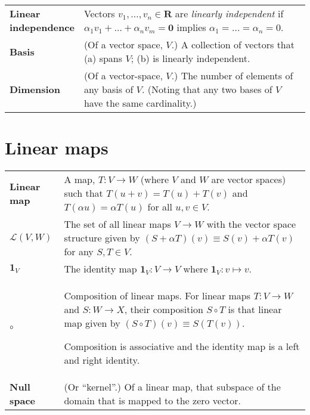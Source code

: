 \documentclass[10pt, a4paper, landscape]{article}
\newcommand{\defn}[1]{\textbf{#1}}
\newcommand{\set}[1]{\mathbold{#1}}
\begin{document}
\begin{multicols*}{3}
\begin{tabularx}{\columnwidth}{@{}l>{\raggedright\arraybackslash}X@{}}
  \parbox[t]{0.8in}{\defn{Linear\\ independence}} & Vectors $v_1, \dots, v_n \in \set{R}$ are \emph{linearly independent} if $\alpha_1 v_1 + \dots + \alpha_n v_m = \set{0}$ implies $\alpha_1 = \dots = \alpha_n=0$. \\

  \defn{Basis} & (Of a vector space, $V$.) A collection of vectors that (a) spans $V$; (b) is linearly independent. \\

  \defn{Dimension} & (Of a vector-space, $V$.) The number of elements of any basis of $V$. (Noting that any two bases of $V$ have the same cardinality.) \\
  
\end{tabularx}



\section*{Linear maps}
\begin{tabularx}{\columnwidth}{@{}l>{\raggedright\arraybackslash}X@{}}
  \toprule

  \defn{Linear map} & A map, $T\colon V\to W$ (where $V$ and $W$ are
  vector spaces) such that $T(u+v) = T(u)+T(v)$ and $T(\alpha u) = \alpha T(u)$
  for all $u,v\in V$. \\

  $\mathcal{L}(V, W)$ & The set of all linear maps $V\to W$ with the vector space structure given by $(S+\alpha T)(v) \equiv S(v)+\alpha T(v)$ for any $S,T\in V$. \\

  $\mathbf{1}_V$ & The identity map $\mathbf{1}_V\colon V\to V$ where $\mathbf{1}_V\colon v\mapsto v$. \\

  $\circ$ & Composition of linear maps. For linear maps $T\colon V\to W$ and $S\colon W\to X$, their composition $S\circ T$ is that linear map given by $(S\circ T)(v) \equiv S(T(v))$.

  Composition is associative and the identity map is a left and right
  identity. \\

  \defn{Null space} & (Or “kernel”.) Of a linear map, that subspace of the domain that is mapped to the zero vector. \\


\end{tabularx}
\end{multicols*}
\end{document}

